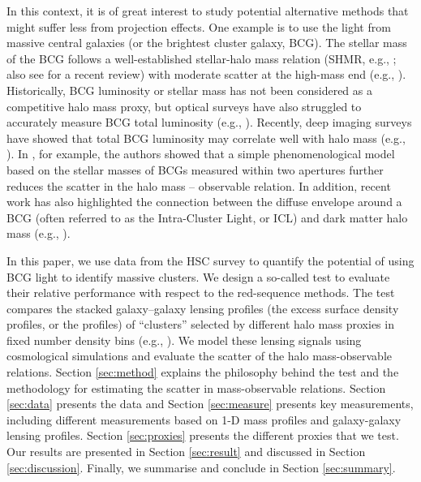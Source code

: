 \documentclass[fleqn,usenatbib,useAMS]{mnras}
\begin{document}
    In this context, it is of great interest to study potential alternative methods that might 
    suffer less from projection effects. 
    One example is to use the light from massive central galaxies (or the brightest cluster galaxy,
    BCG). The stellar mass of the BCG follows a well-established stellar-halo
    mass relation (SHMR, e.g., \citealt{Leauthaud2012, Tinker2017, Kravtsov2018}; also see
    \citealt{Wechsler2018} for a recent review) with moderate scatter at the high-mass end (e.g.,
    \citealt{More2009, Leauthaud2012, Reddick2013, Zu2015, Lehmann2017, Kravtsov2018}).
    Historically, BCG luminosity or stellar mass has not been considered as a competitive halo mass
    proxy, but optical surveys have also struggled to accurately measure BCG total luminosity (e.g.,
    \citealt{Bernardi2013, Huang2018b}). 
    Recently, deep imaging surveys have showed that total BCG luminosity may correlate well with 
    halo mass (e.g., \citealt{Huang2018c, SampaioSantos2021}).
    In \citet{Huang2020}, for example, the authors showed that a simple phenomenological model based
    on the stellar masses of BCGs measured within two apertures further reduces the scatter in the
    halo mass -- observable relation. 
    In addition, recent work has also highlighted the connection between the diffuse envelope around
    a BCG (often referred to as the Intra-Cluster Light, or ICL) and dark matter halo mass (e.g.,
    \citealt{Montes2018, Montes2019, Zhang2019b, Furnell2021}).

    In this paper, we use data from the HSC survey to quantify the potential of using BCG light to
    identify massive clusters. 
    We design a so-called \topn{} test to evaluate their relative performance with respect to the
    red-sequence methods. 
    The \topn{} test compares the stacked galaxy--galaxy lensing profiles (the excess surface
    density profiles, or the \dsigma{} profiles) of ``clusters'' selected by different halo mass
    proxies in fixed number density bins (e.g., \citealt{Reyes2008}). 
    We model these lensing signals using cosmological simulations and evaluate the scatter of the
    halo mass-observable relations.  
    Section \ref{sec:method} explains the philosophy behind the \topn{} test and the methodology 
    for estimating the scatter in mass-observable relations. 
    Section \ref{sec:data} presents the data and Section \ref{sec:measure} presents key
    measurements, including different \mstar{} measurements based on 1-D mass profiles and
    galaxy-galaxy lensing profiles. 
    Section \ref{sec:proxies} presents the different proxies that we test. 
    Our results are presented in Section \ref{sec:result} and discussed in Section
    \ref{sec:discussion}. 
    Finally, we summarise and conclude in Section \ref{sec:summary}.
    
\end{document}
